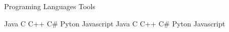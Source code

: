 \documentclass[11pt, a4paper]{cv}
\begin{document}

\lipsum[2]

\begin{multicols}{2}
	Programing Languages \newline
	Tools
\end{multicols}

\begin{multicols}{4}
	\noindent
	Java \newline
	C \newline
	C++ \newline
	C\# \newline
	Pyton \newline
	Javascript \newline
	\faCircle\faCircle\faCircle\faCircle\faCircle \newline
	\faCircle\faCircle\faCircle\faCircle\faCircle \newline
	\faCircle\faCircle\faCircle\faCircle\faCircle \newline
	\faCircle\faCircle\faCircle\faCircle\faCircle \newline
	\faCircle\faCircle\faCircle\faCircle\faCircle \newline
	\faCircle\faCircle\faCircle\faCircle\faCircle \newline
	Java \newline
	C \newline
	C++ \newline
	C\# \newline
	Pyton \newline
	Javascript \newline
	\faCircle\faCircle\faCircle\faCircle\faCircle \newline
	\faCircle\faCircle\faCircle\faCircle\faCircle \newline
	\faCircle\faCircle\faCircle\faCircle\faCircle \newline
	\faCircle\faCircle\faCircle\faCircle\faCircle \newline
	\faCircle\faCircle\faCircle\faCircle\faCircle \newline
	\faCircle\faCircle\faCircle\faCircle\faCircle
\end{multicols}

\newpage


\lipsum[5]
\end{document}

